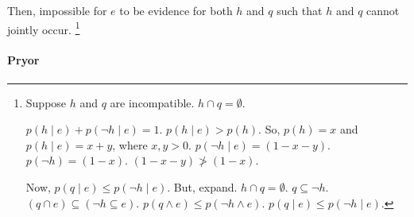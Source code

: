 \begin{note}
  Then, impossible for \(e\) to be evidence for both \(h\) and \(q\) such that \(h\) and \(q\) cannot jointly occur.
  \footnote{
    Suppose \(h\) and \(q\) are incompatible.
    \(h \cap q = \emptyset\).

    \(p(h \mid e) + p(\lnot h \mid e) = 1\).
    \(p(h \mid e) > p(h)\).
    So, \(p(h) = x\) and \(p(h \mid e) = x + y\), where \(x, y > 0\).
    \(p(\lnot h \mid e) = (1 - x - y)\).
    \(p(\lnot h) = (1 - x)\).
    \((1 - x - y) \not> (1 - x)\).

    Now, \(p(q \mid e) \leq p(\lnot h \mid e)\).
    But, expand.
    \(h \cap q = \emptyset\).
    \(q \subseteq \lnot h\).
    \((q \cap e) \subseteq (\lnot h \subseteq e)\).
    \(p(q \land e) \leq p(\lnot h \land e)\).
    \(p(q \mid e) \leq p(\lnot h \mid e)\).
  }
\end{note}

\paragraph{Pryor}

